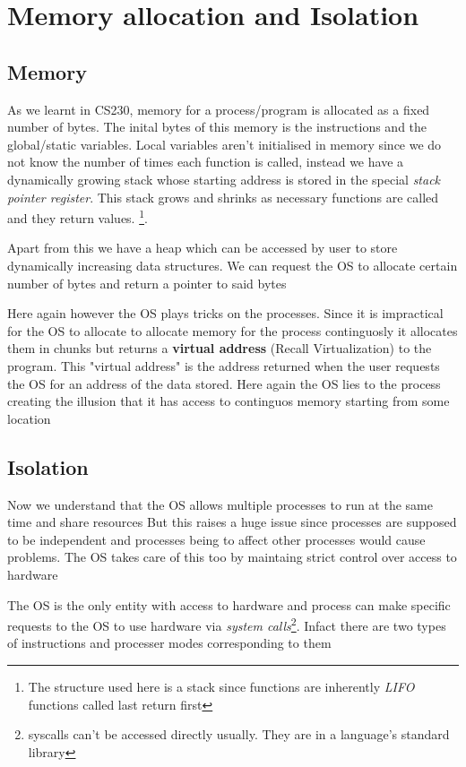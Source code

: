 \documentclass[12pt]{article}
\newcommand{\tbox}[1]{\noindent\fbox{\parbox{\textwidth}{#1}}}
\begin{document}
\section{Memory allocation and Isolation}
\label{section:mem_alloc}
\subsection{Memory}
As we learnt in CS230, memory for a process/program is allocated as a fixed number of bytes. The inital bytes
of this memory is the instructions and the global/static variables. Local variables aren't initialised in memory since
we do not know the number of times each function is called, instead we have a dynamically growing stack whose starting address is
stored in the special \textit{stack pointer register}. This stack grows and shrinks as necessary functions are called and they return values.
\footnote{The structure used here is a stack since functions are inherently \textit{LIFO} functions called last return first}.


Apart from this we have a heap which can be accessed by user to store dynamically increasing data structures. We can request the
OS to allocate certain number of bytes and return a pointer to said bytes


Here again however the OS plays tricks on the processes. Since it is impractical for the OS to allocate to 
allocate memory for the process continguosly it allocates them in chunks but returns a \textbf{virtual address} (Recall Virtualization) to the program. This "virtual address" is the
address returned when the user requests the OS for an address of the data stored. Here again the OS lies to the process creating the illusion that it has access to continguos memory starting
from some location
\newpage
\noindent\tbox{
    \begin{center}
    \textbf{\Huge Lecture 2}
    \end{center}
}
\subsection{Isolation}
    \label{section:Isolation}
    Now we understand that the OS allows multiple processes to run at the same time and share resources
    But this raises a huge issue since processes are supposed to be independent and processes being to affect other 
    processes would cause problems. The OS takes care of this too by maintaing strict control over access to hardware

    The OS is the only entity with access to hardware and process can make specific requests to the OS to use hardware
    via \textit{system calls}\footnote{syscalls can't be accessed directly usually. They are in a language's standard library}. Infact there are two types of instructions and processer modes corresponding to them
\end{document}
